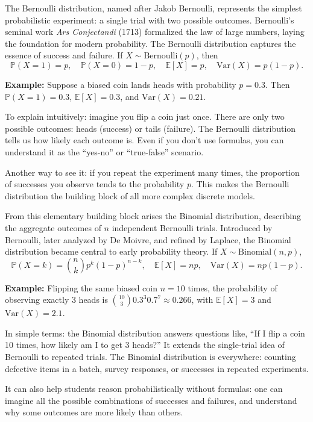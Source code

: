 \documentclass{book}
\begin{document}
\medskip

The Bernoulli distribution, named after Jakob Bernoulli, represents the simplest probabilistic experiment: a single trial with two possible outcomes. Bernoulli's seminal work \emph{Ars Conjectandi} (1713) \cite{bernoulli-ars} formalized the law of large numbers, laying the foundation for modern probability. The Bernoulli distribution captures the essence of success and failure. If $X \sim \text{Bernoulli}(p)$, then
\[
\mathbb{P}(X=1)=p, \quad \mathbb{P}(X=0)=1-p, \quad \mathbb{E}[X] = p, \quad \mathrm{Var}(X) = p(1-p).
\]

\textbf{Example:} Suppose a biased coin lands heads with probability $p=0.3$. Then $\mathbb{P}(X=1)=0.3$, $\mathbb{E}[X]=0.3$, and $\mathrm{Var}(X)=0.21$.

To explain intuitively: imagine you flip a coin just once. There are only two possible outcomes: heads (success) or tails (failure). The Bernoulli distribution tells us how likely each outcome is. Even if you don't use formulas, you can understand it as the “yes-no” or “true-false” scenario.

Another way to see it: if you repeat the experiment many times, the proportion of successes you observe tends to the probability $p$. This makes the Bernoulli distribution the building block of all more complex discrete models.

From this elementary building block arises the Binomial distribution, describing the aggregate outcomes of $n$ independent Bernoulli trials. Introduced by Bernoulli, later analyzed by De Moivre, and refined by Laplace, the Binomial distribution became central to early probability theory. If $X \sim \text{Binomial}(n, p)$,
\[
\mathbb{P}(X=k)=\binom{n}{k} p^k (1-p)^{n-k}, \quad 
\mathbb{E}[X] = np, \quad \mathrm{Var}(X)=np(1-p).
\]

\textbf{Example:} Flipping the same biased coin $n=10$ times, the probability of observing exactly 3 heads is $\binom{10}{3}0.3^3 0.7^7 \approx 0.266$, with $\mathbb{E}[X]=3$ and $\mathrm{Var}(X)=2.1$.

In simple terms: the Binomial distribution answers questions like, “If I flip a coin 10 times, how likely am I to get 3 heads?” It extends the single-trial idea of Bernoulli to repeated trials. The Binomial distribution is everywhere: counting defective items in a batch, survey responses, or successes in repeated experiments.

It can also help students reason probabilistically without formulas: one can imagine all the possible combinations of successes and failures, and understand why some outcomes are more likely than others.
\end{document}
